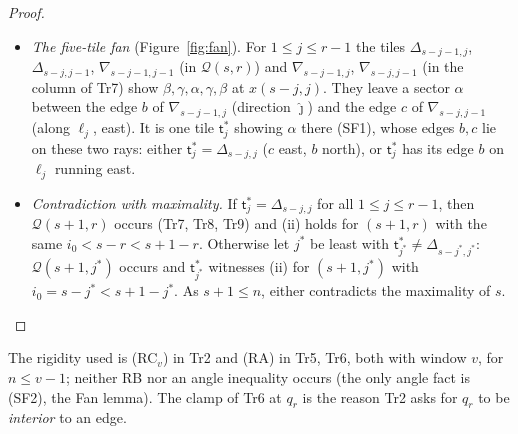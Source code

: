\documentclass[11pt,reqno]{amsart}
\theoremstyle{plain}
\theoremstyle{definition}
\begin{document}
\begin{proof}
\begin{itemize}
\item[\textbf{Tr9}] \emph{The five-tile fan} (Figure~\ref{fig:fan}). For $1\le j\le r-1$ the tiles $\Delta_{s-j-1,j}$, $\Delta_{s-j,j-1}$, $\nabla_{s-j-1,j-1}$ (in $\mathcal Q(s,r)$) and $\nabla_{s-j-1,j}$, $\nabla_{s-j,j-1}$ (in the column of Tr7) show $\beta,\gamma,\alpha,\gamma,\beta$ at $x(s-j,j)$. They leave a sector $\alpha$ between the edge $b$ of $\nabla_{s-j-1,j}$ (direction $\hat\jmath$) and the edge $c$ of $\nabla_{s-j,j-1}$ (along $\ell_j$, east). It is one tile $\mathsf t^\ast_j$ showing $\alpha$ there (SF1), whose edges $b,c$ lie on these two rays: either $\mathsf t^\ast_j=\Delta_{s-j,j}$ ($c$ east, $b$ north), or $\mathsf t^\ast_j$ has its edge $b$ on $\ell_j$ running east.
\item[\textbf{Tr10}] \emph{Contradiction with maximality.} If $\mathsf t^\ast_j=\Delta_{s-j,j}$ for all $1\le j\le r-1$, then $\mathcal Q(s+1,r)$ occurs (Tr7, Tr8, Tr9) and (ii) holds for $(s+1,r)$ with the same $i_0<s-r<s+1-r$. Otherwise let $j^*$ be least with $\mathsf t^\ast_{j^*}\ne\Delta_{s-j^*,j^*}$: $\mathcal Q(s+1,j^*)$ occurs and $\mathsf t^\ast_{j^*}$ witnesses (ii) for $(s+1,j^*)$ with $i_0=s-j^*<s+1-j^*$. As $s+1\le n$, either contradicts the maximality of $s$.
\end{itemize}
\end{proof}
The rigidity used is (RC$_v$) in Tr2 and (RA) in Tr5, Tr6, both with window $v$, for $n\le v-1$; neither RB nor an angle inequality occurs (the only angle fact is (SF2), the Fan lemma). The clamp of Tr6 at $q_r$ is the reason Tr2 asks for $q_r$ to be \emph{interior} to an edge.
\end{document}

